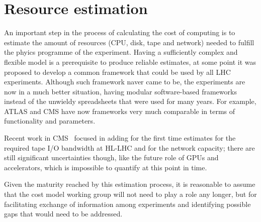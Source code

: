 \section{Resource estimation}
An important step in the process of calculating the cost of computing
is to estimate the amount of resources (CPU, disk, tape and network)
needed to fulfill the phyics programme of the experiment. Having a
sufficiently complex and flexible model is a prerequisite to produce
reliable estimates, at some point it was proposed to develop a common
framework that could be used by all LHC experiments. Although such
framework naver came to be, the experiments are now in a much better
situation, having modular software-based frameworks instead of the
unwieldy spreadsheets that were used for many years. For example,
ATLAS and CMS have now frameworks very much comparable
in terms of functionality and parameters.

Recent work in CMS~\cite{cmsres} focused in adding for the first time
estimates for the required tape I/O bandwidth at HL-LHC and for the
network capacity; there are still significant uncertainties though,
like the future role of GPUs and accelerators, which is impossible to
quantify at this point in time.

Given the maturity reached by this estimation process, it is
reasonable to assume that the cost model working group will not need
to play a role any longer, but for facilitating exchange of
information among experiments and identifying possible gaps that would
need to be addressed.
